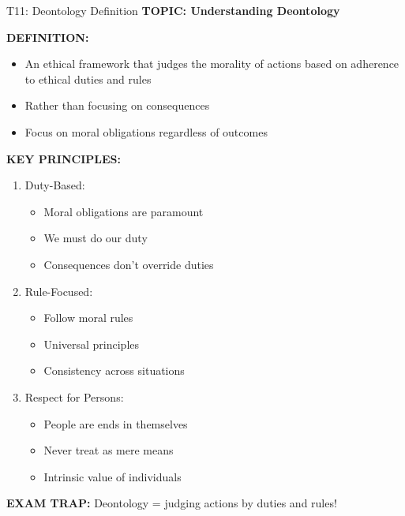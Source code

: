 \documentclass[8pt]{beamer}
\begin{document}
	\begin{frame}{T11: Deontology Definition}
		\fontsize{6.5}{7.5}\selectfont
		\textbf{TOPIC: Understanding Deontology}
		
		\vspace{0.1cm}
		\textbf{DEFINITION:}
		\begin{itemize}
			\item An ethical framework that judges the morality of actions based on adherence to ethical duties and rules
			\item Rather than focusing on consequences
			\item Focus on moral obligations regardless of outcomes
		\end{itemize}
		
		\vspace{0.1cm}
		\textbf{KEY PRINCIPLES:}
		\begin{enumerate}
			\item \textcolor{myblue}{Duty-Based:}
			\begin{itemize}
				\item Moral obligations are paramount
				\item We must do our duty
				\item Consequences don't override duties
			\end{itemize}
			\item \textcolor{myblue}{Rule-Focused:}
			\begin{itemize}
				\item Follow moral rules
				\item Universal principles
				\item Consistency across situations
			\end{itemize}
			\item \textcolor{myblue}{Respect for Persons:}
			\begin{itemize}
				\item People are ends in themselves
				\item Never treat as mere means
				\item Intrinsic value of individuals
			\end{itemize}
		\end{enumerate}
		
		\textcolor{myred}{\textbf{EXAM TRAP:}} Deontology = \textcolor{myblue}{judging actions by duties and rules}!
	\end{frame}
	
\end{document}

